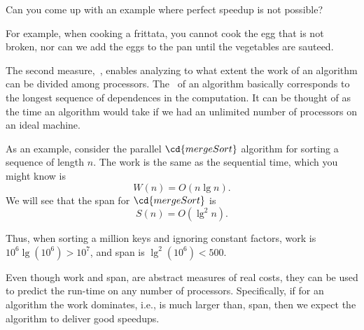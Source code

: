 \begin{teachask}
Can you come up with an example where perfect speedup is not possible?
\end{teachask}
%

\begin{teachnote}
For example, when cooking a frittata, you cannot cook the egg that is
not broken, nor can we add the eggs to the pan until the vegetables
are sauteed.
\end{teachnote}


\begin{gram}[Span]
The second measure,~, enables analyzing to what extent the
work of an algorithm can be divided among processors.  The~
of an algorithm basically corresponds to the longest sequence of
dependences in the computation.  It can be thought of as the time an
algorithm would take if we had an unlimited number of processors on an
ideal machine.
\end{gram}
%

\begin{example}
\label{ex:intro::mergesort-cost}
As an example, consider the parallel $\cd{mergeSort}$ algorithm for
sorting a sequence of length $n$.  The work is the same as the
sequential time, which you might know is
\[
W(n) = O(n \lg{n}).
\] 
%
We will see that the span for
$\cd{mergeSort}$ is
\[
S(n) = O(\lg^2{n}).
\]

Thus, when  sorting a million keys and ignoring constant factors, 
work is $10^6\lg (10^6) > 10^7$, and 
%
span is 
$\lg^2(10^6) < 500.$
%
\end{example}


\begin{gram}
Even though work and span, are abstract measures of real costs, they
can be used to predict the run-time on any number of processors.
%
Specifically, if for an algorithm the work dominates, i.e., is much
larger than, span, then we expect the algorithm to deliver good
speedups.
\end{gram}
%

